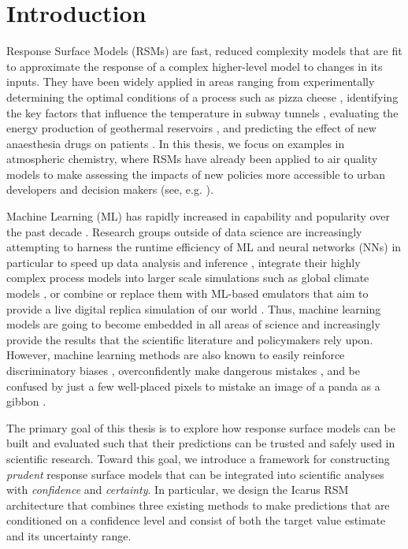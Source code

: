 \chapter{Introduction}

Response Surface Models (RSMs) are fast, reduced complexity models that are fit to approximate the response of a complex higher-level model to changes in its inputs. They have been widely applied in areas ranging from experimentally determining the optimal conditions of a process \cite{response-surface-modelling-1951} such as pizza cheese \cite{pizza-optimisation-2018}, identifying the key factors that influence the temperature in subway tunnels \cite{subway-temperature-rsm-2019}, evaluating the energy production of geothermal reservoirs \cite{geothermal-rsm-2016}, and predicting the effect of new anaesthesia drugs on patients \cite{anesthesia-rsm-2015}. In this thesis, we focus on examples in atmospheric chemistry, where RSMs have already been applied to air quality models to make assessing the impacts of new policies more accessible to urban developers and decision makers (see, e.g. \cite{rsm-epa-2006, pf-rsm-2018, deep-rsm-2020}).

Machine Learning (ML) has rapidly increased in capability and popularity over the past decade \cite{ml-trends-2021, ml-applications-2021}. Research groups outside of data science are increasingly attempting to harness the runtime efficiency of ML and neural networks (NNs) in particular to speed up data analysis and inference \cite{srsm-2004}, integrate their highly complex process models into larger scale simulations such as global climate models \cite{hydrology-ml-2021, hybrid-model-2022}, or combine or replace them with ML-based emulators that aim to provide a live digital replica simulation of our world \cite{simulation-ml-2022, virtual-laboratories-2022}. Thus, machine learning models are going to become embedded in all areas of science and increasingly provide the results that the scientific literature and policymakers rely upon. However, machine learning methods are also known to easily reinforce discriminatory biases \cite{ml-bias-discrimination-2017, prediction-inequity-2019}, overconfidently make dangerous mistakes \cite{ood-baseline-2016}, and be confused by just a few well-placed pixels to mistake an image of a panda as a gibbon \cite{aversarial-attacks-2015}.

\newpar The primary goal of this thesis is to explore how response surface models can be built and evaluated such that their predictions can be trusted and safely used in scientific research. Toward this goal, we introduce a framework for constructing \textit{prudent} response surface models that can be integrated into scientific analyses with \textit{confidence} and \textit{certainty}. In particular, we design the Icarus RSM architecture that combines three existing methods to make predictions that are conditioned on a confidence level and consist of both the target value estimate and its uncertainty range.

